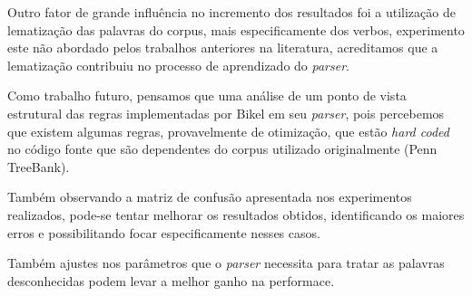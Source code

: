 Outro fator de grande influência no incremento dos resultados foi a utilização de lematização das palavras do corpus, mais especificamente dos verbos, experimento este não abordado pelos trabalhos anteriores na literatura, acreditamos que a lematização contribuiu no processo de aprendizado do \emph{parser}.

Como trabalho futuro, pensamos que uma análise de um ponto de vista estrutural das regras implementadas por Bikel em seu \emph{parser}, pois percebemos que existem algumas regras, provavelmente de otimização, que estão \emph{hard coded} no código fonte que são dependentes do corpus utilizado originalmente (Penn TreeBank). 

Também observando a matriz de confusão apresentada nos experimentos realizados, pode-se tentar melhorar os resultados obtidos, identificando os maiores erros e possibilitando focar especificamente nesses casos. 

Também ajustes nos parâmetros que o \emph{parser} necessita para tratar as palavras desconhecidas podem levar a melhor ganho na performace.
